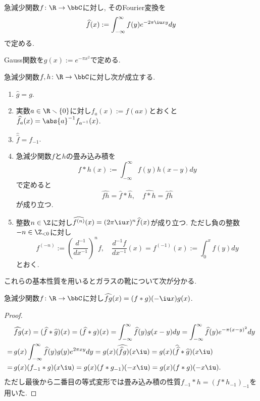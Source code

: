 \documentclass[11pt,b5paper,oneside,lualatex]{ltjsarticle} %
\renewcommand{\setminus}{\smallsetminus}
\numberwithin{equation}{section} %
\begin{document}
\begin{dfn}
	急減少関数$ f \colon \R \to \bbC $に対し, そのFourier変換を
	\[
	\widehat{f}(x) := \int_{-\infty}^{\infty} f(y) e^{-2\pi\iu xy} dy
	\]
	で定める. 
\end{dfn}

\begin{nota}
	Gauss関数を$ g(x) := e^{-\pi x^2} $で定める. 
\end{nota}

\begin{lem} \label{lem:Fourier}
	急減少関数$ f, h \colon \R \to \bbC $に対し次が成立する. 
	\begin{enumerate}
		\item $ \widehat{g} = g $.
		\item 実数$ a \in \R \setminus \{ 0 \} $に対し$ f_a(x) := f(ax) $とおくと
		$ \widehat{f_a}(x) = \abs{a}^{-1} f_{a^{-1}} (x) $.
		\item $ \widehat{\widehat{f}} = f_{-1} $.
		\item 急減少関数$ f $と$ h $の畳み込み積を
		\[
		f \ast h (x) := \int_{-\infty}^{\infty} f(y) h(x-y) dy
		\]
		で定めると
		\[
		\widehat{fh} = \widehat{f} \ast \widehat{h}, \quad
		\widehat{f \ast h} = \widehat{f} \widehat{h}
		\]
		 が成り立つ. 
		 \item \label{item:lem:Fourier_diff}
		 整数$ n \in \Z $に対し$ \widehat{f^{(n)}} (x) = (2 \pi \iu x)^n \widehat{f}(x) $が成り立つ. 
		 ただし負の整数$ -n \in \Z_{<0} $に対し
		 \[
		 f^{(-n)} := \left( \frac{d^{-1}}{dx^{-1}} \right)^n f, \quad
		 \frac{d^{-1} f}{dx^{-1}} (x) = f^{(-1)} (x) := \int_{0}^{x} f(y) dy
		 \]
		 とおく.
	\end{enumerate}
\end{lem}

これらの基本性質を用いるとガラスの靴について次が分かる. 

\begin{lem}
	急減少関数$ f \colon \R \to \bbC $に対し$ \widehat{fg}(x) = (f \ast g)(-\iu x) g(x)  $.
\end{lem}

\begin{proof}
	\begin{align}
		&\widehat{fg}(x) 
		=
		(\widehat{f} \ast \widehat{g}) (x)
		=
		(\widehat{f} \ast g) (x)
		=
		\int_{-\infty}^{\infty} \widehat{f} (y) g(x-y) dy
		=
		\int_{-\infty}^{\infty} \widehat{f} (y) e^{-\pi (x-y)^2} dy
		\\
		= \,
		&g(x) \int_{-\infty}^{\infty} \widehat{f} (y) g(y) e^{2\pi xy} dy
		=
		g(x) \widehat{(\widehat{f} g)} (x \iu)
		=
		g(x) ( \widehat{\widehat{f}} \ast \widehat{g}) (x \iu)
		\\
		= \,
		&g(x) ( f_{-1} \ast g) (x \iu)
		=
		g(x) ( f \ast g_{-1}) (-x \iu)
		=
		g(x) ( f \ast g) (-x \iu).
	\end{align}
	ただし最後から二番目の等式変形では畳み込み積の性質$ f_{-1} \ast h =  (f \ast h_{-1})_{-1} $を用いた. 
\end{proof}
\end{document}
